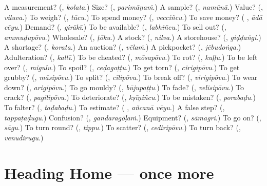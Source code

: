 \begin{tcolorbox}[breakable,colback=teal!4,colframe=teal!35!black,title={Before you move on}]
A measurement? (\textbf{}, \emph{kolata}.) Size? (\textbf{}, \emph{parimāṇaṁ}.) A sample? (\textbf{}, \emph{namūnā}.) Value? (\textbf{}, \emph{viluva}.) To weigh? (\textbf{}, \emph{tūcu}.) To spend money? (\textbf{}, \emph{vecciñcu}.) To save money? (\textbf{ }, \emph{ādā cēyu}.) Demand? (\textbf{}, \emph{girākī}.) To be available? (\textbf{}, \emph{labhiñcu}.) To sell out? (\textbf{}, \emph{ammuḍupōvu}.) Wholesale? (\textbf{}, \emph{ṭōku}.) A stock? (\textbf{}, \emph{nilva}.) A storehouse? (\textbf{}, \emph{giḍḍaṅgi}.) A shortage? (\textbf{}, \emph{korata}.) An auction? (\textbf{}, \emph{vēlaṁ}.) A pickpocket? (\textbf{}, \emph{jēbudoṅga}.) Adulteration? (\textbf{}, \emph{kaltī}.) To be cheated? (\textbf{}, \emph{mōsapōvu}.) To rot? (\textbf{}, \emph{kuḷḷu}.) To be left over? (\textbf{}, \emph{migulu}.) To spoil? (\textbf{}, \emph{ceḍagoṭṭu}.) To get torn? (\textbf{}, \emph{cirigipōvu}.) To get grubby? (\textbf{}, \emph{māsipōvu}.) To split? (\textbf{}, \emph{cīlipōvu}.) To break off? (\textbf{}, \emph{virigipōvu}.) To wear down? (\textbf{}, \emph{arigipōvu}.) To go mouldy? (\textbf{}, \emph{būjupaṭṭu}.) To fade? (\textbf{}, \emph{velisipōvu}.) To crack? (\textbf{}, \emph{pagilipōvu}.) To deteriorate? (\textbf{}, \emph{kṣīṇiñcu}.) To be mistaken? (\textbf{}, \emph{porabaḍu}.) To falter? (\textbf{}, \emph{taḍabaḍu}.) To estimate? (\textbf{ }, \emph{añcanā vēyu}.) A false step? (\textbf{}, \emph{tappaṭaḍugu}.) Confusion? (\textbf{}, \emph{gandaragōḷaṁ}.) Equipment? (\textbf{}, \emph{sāmagri}.) To go on? (\textbf{}, \emph{sāgu}.) To turn round? (\textbf{}, \emph{tippu}.) To scatter? (\textbf{}, \emph{cediripōvu}.) To turn back? (\textbf{}, \emph{venudirugu}.)
\end{tcolorbox}
\section[(dialogue)]{Heading Home — once more}


